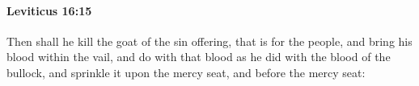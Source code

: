 
		\paragraph{Leviticus 16:15} %
			\label{LEVITICUS-16-15}

			Then shall he kill the goat of the sin offering, that is for the people, and bring his blood within the vail, and do with that blood as he did with the blood of the bullock, and sprinkle it upon the mercy seat, and before the mercy seat:


